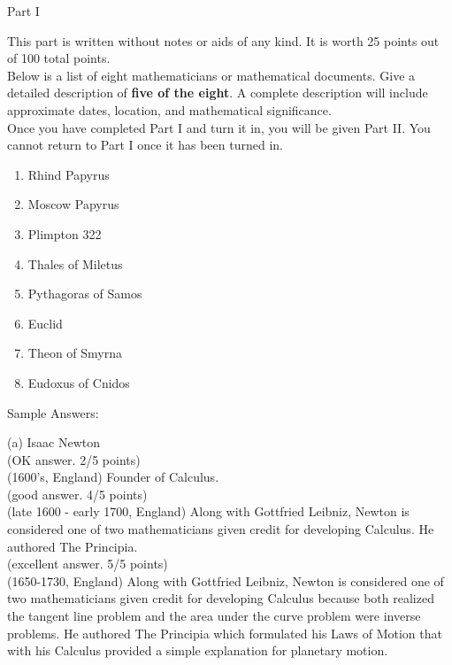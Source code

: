 \documentclass[11pt]{article}
\def\bc{\begin{center}}
\def\ec{\end{center}}
\def\be{\begin{enumerate}}
\def\ee{\end{enumerate}}
\begin{document}
\thispagestyle{fancy}

\vspace*{-0.3in}

\bc Part I \ec

This part is written without notes or aids of any kind. It is worth 25 points out of 100 total points. \\

Below is a list of eight mathematicians or mathematical documents. Give a detailed description of \textbf{five of the eight}.  A complete description will include approximate dates, location, and mathematical significance. \\

Once you have completed Part I and turn it in, you will be given Part II. You cannot return to Part I once it has been turned in.\\

\be
\item Rhind Papyrus
\vfill
\item Moscow Papyrus
\vfill
\item Plimpton 322
\vfill
\newpage
\item Thales of Miletus
\vfill
\item Pythagoras of Samos
\vfill
\item Euclid
\vfill
\item Theon of Smyrna
\vfill
\item Eudoxus of Cnidos
\vfill
\ee
\newpage 
Sample Answers:

(a) Isaac Newton\\


\noindent (OK answer. 2/5 points)\\
(1600's, England) Founder of Calculus.\\


\noindent (good answer. 4/5 points)\\
(late 1600 - early 1700, England) Along with Gottfried Leibniz, Newton is considered one of two  
mathematicians given credit for developing Calculus. He authored The Principia.\\


\noindent (excellent answer. 5/5 points)\\
(1650-1730, England) Along with Gottfried Leibniz, Newton is considered one of two  
mathematicians given credit for developing Calculus because both realized the tangent line problem and the area under the curve problem were inverse problems. He authored The Principia which formulated his Laws of Motion that with his Calculus provided a simple explanation for planetary motion. \\
\end{document}
